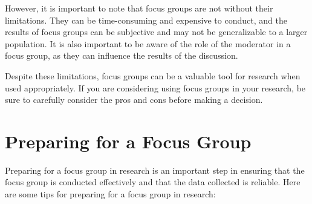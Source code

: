 \documentclass[
  b5paper]{book}
\begin{document}
However, it is important to note that focus groups are not without their limitations. They can be time-consuming and expensive to conduct, and the results of focus groups can be subjective and may not be generalizable to a larger population. It is also important to be aware of the role of the moderator in a focus group, as they can influence the results of the discussion.

Despite these limitations, focus groups can be a valuable tool for research when used appropriately. If you are considering using focus groups in your research, be sure to carefully consider the pros and cons before making a decision.

\hypertarget{preparing-for-a-focus-group}{%
\section*{Preparing for a Focus Group}\label{preparing-for-a-focus-group}}

Preparing for a focus group in research is an important step in ensuring that the focus group is conducted effectively and that the data collected is reliable. Here are some tips for preparing for a focus group in research:
\end{document}
